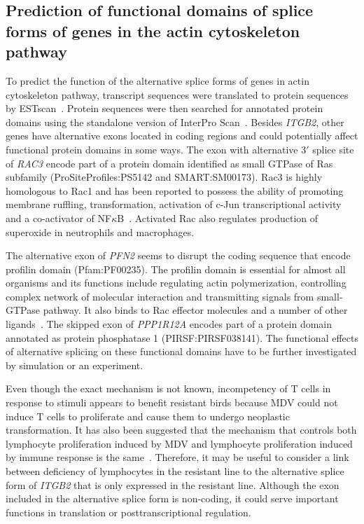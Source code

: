 \documentclass[10pt]{article}
\begin{document}
\subsection*{Prediction of functional domains of splice forms of
genes in the actin cytoskeleton pathway}

To predict the function of the alternative splice forms of genes
in actin cytoskeleton pathway, transcript sequences were
translated to protein sequences by
ESTscan~\cite{iseli1999estscan}.  Protein sequences were then
searched for annotated protein domains using the standalone
version of InterPro Scan~\cite{quevillon2005interproscan}.
Besides {\em ITGB2}, other genes have alternative exons located
in coding regions and could potentially affect functional protein
domains in some ways.  The exon with alternative 3$\prime$ splice
site of {\em RAC3} encode part of a protein domain identified as
small GTPase of Ras subfamily (ProSiteProfiles:PS5142 and
SMART:SM00173).  Rac3 is highly homologous to Rac1 and has been
reported to possess the ability of promoting membrane ruffling,
transformation, activation of c-Jun transcriptional activity and
a co-activator of NF$\kappa$B~\cite{werbajh2000rac}.  Activated
Rac also regulates production of superoxide in neutrophils and
macrophages.

The alternative exon of {\em PFN2} seems to disrupt the coding
sequence that encode profilin domain (Pfam:PF00235).  The
profilin domain is essential for almost all organisms and its
functions include regulating actin polymerization, controlling
complex network of molecular interaction and transmitting signals
from small-GTPase pathway.  It also binds to Rac effector
molecules and a number of other ligands~\cite{witke2004role}.
The skipped exon of {\em PPP1R12A} encodes part of a protein
domain annotated as protein phosphatase 1 (PIRSF:PIRSF038141).
The functional effects of alternative splicing on these
functional domains have to be further investigated by simulation
or an experiment.

Even though the exact mechanism is not known, incompetency of T
cells in response to stimuli appears to benefit resistant birds
because MDV could not induce T cells to proliferate and cause
them to undergo neoplastic transformation.  It has also been
suggested that the mechanism that controls both lymphocyte
proliferation induced by MDV and lymphocyte proliferation induced
by immune response is the
same~\cite{pazderka1975histocompatibility}.  Therefore, it may be
useful to consider a link between deficiency of lymphocytes in
the resistant line to the alternative splice form of {\em ITGB2}
that is only expressed in the resistant line.  Although the exon
included in the alternative splice form is non-coding, it could
serve important functions in translation or posttranscriptional
regulation.
\end{document}
